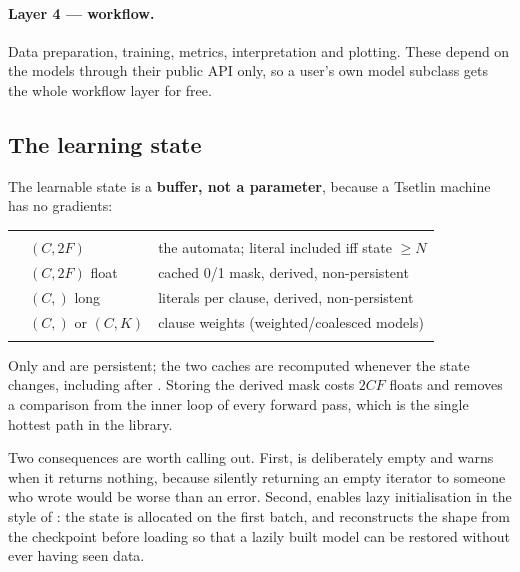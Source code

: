 \paragraph{Layer 4 --- workflow.}
Data preparation, training, metrics, interpretation and plotting. These depend on the models
through their public API only, so a user's own model subclass gets the whole workflow layer
for free.

\subsection{The learning state}

The learnable state is a \textbf{buffer, not a parameter}, because a Tsetlin machine has no
gradients:

\begin{center}\small
\begin{tabularx}{0.95\linewidth}{@{}L{3.4cm}L{3.5cm}>{\raggedright\arraybackslash}X@{}}
\ttoprule
{} &  & \\
\ttmidrule
{} & $(C, 2F)$  & the automata; literal included iff state $\ge N$\\
 & $(C, 2F)$ float & cached 0/1 mask, derived, non-persistent\\
 & $(C,)$ long & literals per clause, derived, non-persistent\\
 & $(C,)$ or $(C,K)$  & clause weights (weighted\slash coalesced models)\\
\ttbotrule
\end{tabularx}
\end{center}

Only  and  are persistent; the two caches are recomputed
whenever the state changes, including after . Storing the derived
mask costs $2CF$ floats and removes a comparison from the inner loop of every forward pass,
which is the single hottest path in the library.

Two consequences are worth calling out. First,  is deliberately
empty and warns when it returns nothing, because silently returning an empty iterator to
someone who wrote  would be worse than an error. Second,
 enables lazy initialisation in the style of
: the state is allocated on the first batch, and
 reconstructs the shape from the checkpoint before loading so
that a lazily built model can be restored without ever having seen data.

